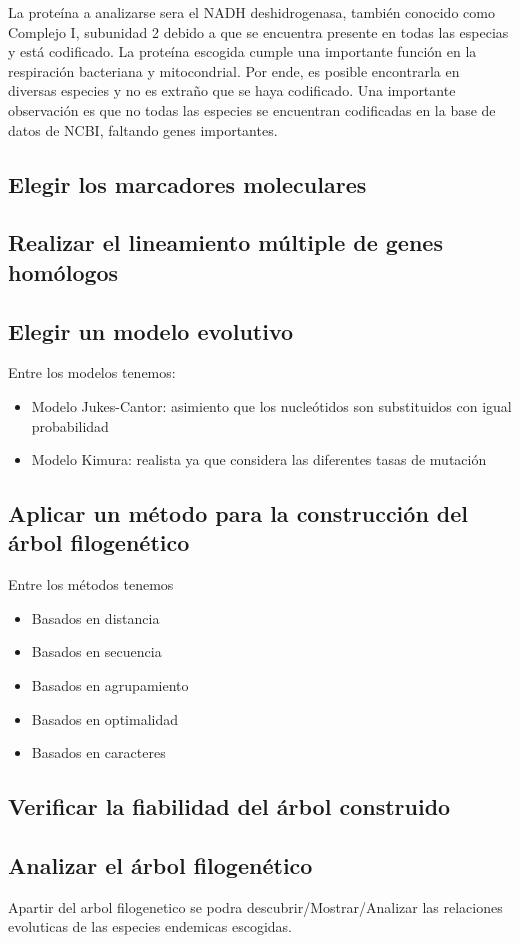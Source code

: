 \documentclass[a4paper]{article}
\begin{document}
La proteína a analizarse sera el NADH deshidrogenasa, también conocido como Complejo I, subunidad 2 debido a que se encuentra presente en todas las especias y está codificado. 
La proteína escogida cumple una importante función en la respiración bacteriana y mitocondrial. Por ende, es posible encontrarla en diversas especies y no es extraño que se haya codificado.
Una importante observación es que no todas las especies se encuentran codificadas en la base de datos de NCBI, faltando genes importantes.
\subsection{Elegir los marcadores moleculares}
\subsection{Realizar el lineamiento múltiple de genes homólogos}
\subsection{Elegir un modelo evolutivo}
Entre los modelos tenemos:

\begin{itemize}
\item Modelo Jukes-Cantor: asimiento que los nucleótidos son substituidos con igual probabilidad
\item Modelo Kimura: realista ya que considera las diferentes tasas de mutación
\end{itemize}
\subsection{Aplicar un método para la construcción del árbol filogenético}	
Entre los métodos tenemos 
\begin{itemize}
	\item Basados en distancia
	\item Basados en secuencia
	\item Basados en agrupamiento
	\item Basados en optimalidad
	\item Basados en caracteres
\end{itemize}

\subsection{Verificar la fiabilidad del árbol construido}

\subsection{Analizar el árbol filogenético}
Apartir del arbol filogenetico se podra descubrir/Mostrar/Analizar las relaciones evoluticas de las especies endemicas escogidas.
\end{document}
